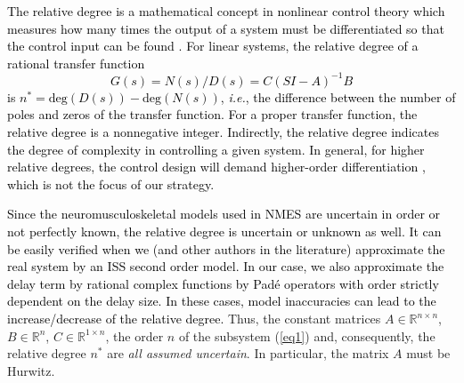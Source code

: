 \documentclass[review]{elsarticle}
\begin{document}
\textcolor{black}{The relative degree is a mathematical concept in nonlinear control theory which measures how \textcolor{black}{many times} the output of a system must be differentiated so that the control input can be found \cite{K:2002}. For linear systems, 
the relative degree of a rational transfer function $$G(s)=N(s)/D(s)=C(SI-A)^{-1}B$$ is $n^*=\text{deg}(D(s))-\text{deg}(N(s))$, \textit{i.e.}, the difference between the number of poles and zeros of the transfer function. For a proper
transfer function, the relative degree is a nonnegative integer.} \textcolor{black}{Indirectly, the relative degree indicates the degree of complexity in controlling a given system. In general, for higher relative degrees, the control design will demand higher-order differentiation \cite{L:2000}, which is not the focus of our strategy.}





\textcolor{black}{
Since the neuromusculoskeletal models used in NMES are uncertain in order or not perfectly known, the relative degree is uncertain or
unknown as well. It can be easily verified when we (and other authors in the literature) approximate the real system by \textcolor{black}{an} ISS second order model. In our case, we also approximate the delay term by rational complex functions by Pad\'e operators with order strictly dependent on the delay size. In \textcolor{black}{these} cases, model inaccuracies can lead to the increase/decrease of the
relative degree.} Thus, the constant matrices $A\in\mathbb{R}^{n\times n}$, $B\in\mathbb{R}^{n}$, $C\in\mathbb{R}^{1\times n}$, the order $n$ of the subsystem (\ref{eq1}) and, consequently, the relative degree $n^*$ are \textit{all assumed uncertain}. In particular, the matrix $A$ must be Hurwitz.
\end{document}
